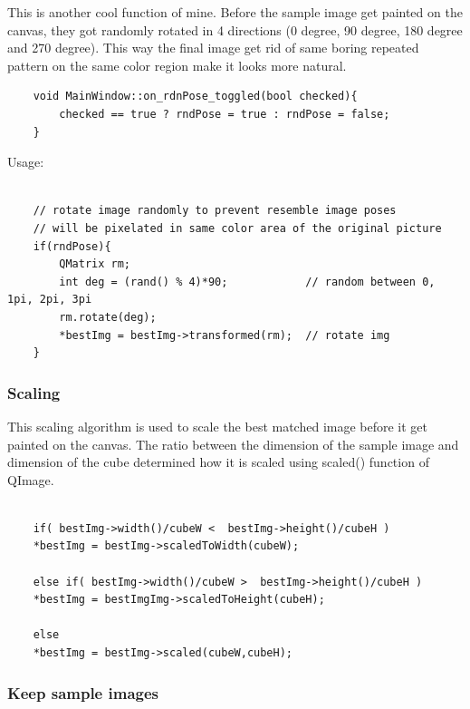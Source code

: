 \documentclass[english]{article}
\begin{document}
{This is another cool function of mine. Before the sample image get painted on the canvas, they got randomly rotated in 4 directions (0 degree, 90 degree, 180 degree and 270 degree). This way the final image get rid of same boring repeated pattern on the same color region make it looks more natural.

\lstset{language=C++}
\begin{lstlisting}
	void MainWindow::on_rdnPose_toggled(bool checked){
		checked == true ? rndPose = true : rndPose = false;
	}

\end{lstlisting}

Usage: 

\lstset{language=C++}
\begin{lstlisting}

	// rotate image randomly to prevent resemble image poses
	// will be pixelated in same color area of the original picture
	if(rndPose){
		QMatrix rm;
		int deg = (rand() % 4)*90;			  // random between 0, 1pi, 2pi, 3pi
		rm.rotate(deg);                     
		*bestImg = bestImg->transformed(rm);  // rotate img
	}

\end{lstlisting}



\subsubsection{Scaling}

This scaling algorithm is used to scale the best matched image before it get painted on the canvas. The ratio between the dimension of the sample image and dimension of the cube determined how it is scaled using scaled() function of QImage.

\lstset{language=C++}
\begin{lstlisting}

	if( bestImg->width()/cubeW <  bestImg->height()/cubeH )
	*bestImg = bestImg->scaledToWidth(cubeW);
	
	else if( bestImg->width()/cubeW >  bestImg->height()/cubeH )
	*bestImg = bestImgImg->scaledToHeight(cubeH);
	
	else
	*bestImg = bestImg->scaled(cubeW,cubeH);

\end{lstlisting}



\subsubsection{Keep sample images}

}
\end{document}
